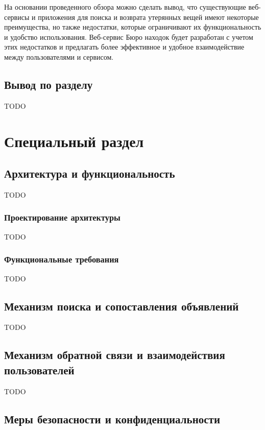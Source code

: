\documentclass{mirea}
\begin{document}
На основании проведенного обзора можно сделать вывод, 
что существующие веб-сервисы и приложения для поиска и возврата 
утерянных вещей имеют некоторые преимущества, но также недостатки, 
которые ограничивают их функциональность и удобство использования. 
Веб-сервис Бюро находок будет разработан с учетом этих недостатков 
и предлагать более эффективное и удобное взаимодействие 
между пользователями и сервисом.

\subsection*{Вывод по разделу}

TODO

\section{Специальный раздел}

\subsection{Архитектура и функциональность}

TODO

\subsubsection{Проектирование архитектуры}

TODO

\subsubsection{Функциональные требования}

TODO

\subsection{Механизм поиска и сопоставления объявлений}

TODO

\subsection{Механизм обратной связи и взаимодействия пользователей}

TODO

\subsection{Меры безопасности и конфиденциальности}
\end{document}
